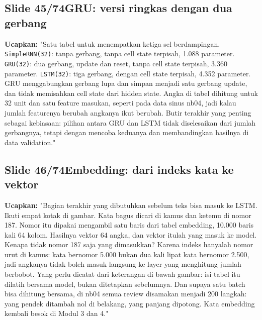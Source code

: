 \documentclass[11pt]{article}
\renewcommand{\framebox}[1]{\colorbox{acc!15}{\textcolor{acc}{\textbf{#1}}}}
\begin{document}
\subsection*{\framebox{Slide 45/74}\quad GRU: versi ringkas dengan dua gerbang}
\textbf{Ucapkan:} "Satu tabel untuk menempatkan ketiga sel berdampingan. \texttt{SimpleRNN(32)}: tanpa gerbang, tanpa cell state terpisah, 1.088 parameter. \texttt{GRU(32)}: dua gerbang, update dan reset, tanpa cell state terpisah, 3.360 parameter. \texttt{LSTM(32)}: tiga gerbang, dengan cell state terpisah, 4.352 parameter. GRU menggabungkan gerbang lupa dan simpan menjadi satu gerbang update, dan tidak memisahkan cell state dari hidden state. Angka di tabel dihitung untuk 32 unit dan satu feature masukan, seperti pada data sinus nb04, jadi kalau jumlah featurenya berubah angkanya ikut berubah. Butir terakhir yang penting sebagai kebiasaan: pilihan antara GRU dan LSTM tidak diselesaikan dari jumlah gerbangnya, tetapi dengan mencoba keduanya dan membandingkan hasilnya di data validation."\\[2pt]

\subsection*{\framebox{Slide 46/74}\quad Embedding: dari indeks kata ke vektor}
\textbf{Ucapkan:} "Bagian terakhir yang dibutuhkan sebelum teks bisa masuk ke LSTM. Ikuti empat kotak di gambar. Kata bagus dicari di kamus dan ketemu di nomor 187. Nomor itu dipakai mengambil satu baris dari tabel embedding, 10.000 baris kali 64 kolom. Hasilnya vektor 64 angka, dan vektor itulah yang masuk ke model. Kenapa tidak nomor 187 saja yang dimasukkan? Karena indeks hanyalah nomor urut di kamus: kata bernomor 5.000 bukan dua kali lipat kata bernomor 2.500, jadi angkanya tidak boleh masuk langsung ke layer yang menghitung jumlah berbobot. Yang perlu dicatat dari keterangan di bawah gambar: isi tabel itu dilatih bersama model, bukan ditetapkan sebelumnya. Dan supaya satu batch bisa dihitung bersama, di nb04 semua review disamakan menjadi 200 langkah: yang pendek ditambah nol di belakang, yang panjang dipotong. Kata embedding kembali besok di Modul 3 dan 4."\\[2pt]
\end{document}
